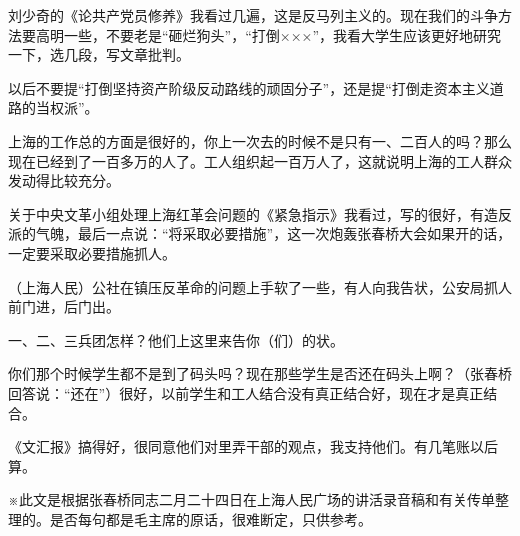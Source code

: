 刘少奇的《论共产党员修养》我看过几遍，这是反马列主义的。现在我们的斗争方法要高明一些，不要老是“砸烂狗头”，“打倒×××”，我看大学生应该更好地研究一下，选几段，写文章批判。

以后不要提“打倒坚持资产阶级反动路线的顽固分子”，还是提“打倒走资本主义道路的当权派”。

上海的工作总的方面是很好的，你上一次去的时候不是只有一、二百人的吗？那么现在已经到了一百多万的人了。工人组织起一百万人了，这就说明上海的工人群众发动得比较充分。

关于中央文革小组处理上海红革会问题的《紧急指示》我看过，写的很好，有造反派的气魄，最后一点说：“将采取必要措施”，这一次炮轰张春桥大会如果开的话，一定要采取必要措施抓人。

（上海人民）公社在镇压反革命的问题上手软了一些，有人向我告状，公安局抓人前门进，后门出。

一、二、三兵团怎样？他们上这里来告你（们）的状。

你们那个时候学生都不是到了码头吗？现在那些学生是否还在码头上啊？（张春桥回答说：“还在”）很好，以前学生和工人结合没有真正结合好，现在才是真正结合。

《文汇报》搞得好，很同意他们对里弄干部的观点，我支持他们。有几笔账以后算。

※此文是根据张春桥同志二月二十四日在上海人民广场的讲活录音稿和有关传单整理的。是否每句都是毛主席的原话，很难断定，只供参考。

